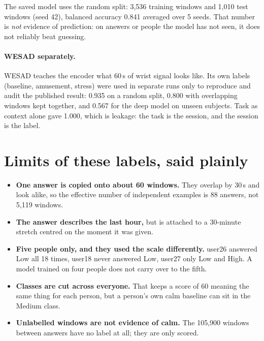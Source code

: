 \documentclass[11pt,a4paper]{article}
\begin{document}
The saved model uses the random split: 3,536 training windows and 1,010 test windows (seed 42), balanced
accuracy 0.841 averaged over 5 seeds. That number is \emph{not} evidence of prediction: on answers or
people the model has not seen, it does not reliably beat guessing.

\paragraph{WESAD separately.} WESAD teaches the encoder what 60\,s of wrist signal looks like. Its own
labels (baseline, amusement, stress) were used in separate runs only to reproduce and audit the published
result: 0.935 on a random split, 0.800 with overlapping windows kept together, and 0.567 for the deep model
on unseen subjects. Task as context alone gave 1.000, which is leakage: the task is the session, and the
session is the label.

\section{Limits of these labels, said plainly}
\begin{itemize}
\item \textbf{One answer is copied onto about 60 windows.} They overlap by 30\,s and look alike, so the
effective number of independent examples is 88 answers, not 5,119 windows.
\item \textbf{The answer describes the last hour,} but is attached to a 30-minute stretch centred on the
moment it was given.
\item \textbf{Five people only, and they used the scale differently.} user26 answered Low all 18 times,
user18 never answered Low, user27 only Low and High. A model trained on four people does not carry over
to the fifth.
\item \textbf{Classes are cut across everyone.} That keeps a score of 60 meaning the same thing for each
person, but a person's own calm baseline can sit in the Medium class.
\item \textbf{Unlabelled windows are not evidence of calm.} The 105,900 windows between answers have no
label at all; they are only scored.
\end{itemize}
\end{document}
